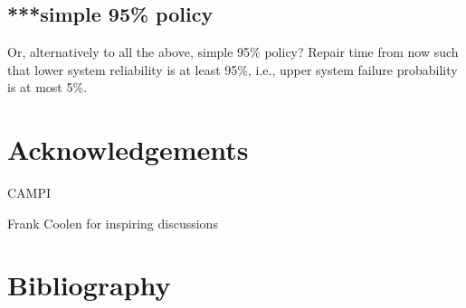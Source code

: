 \documentclass[authoryear]{elsarticle}
\begin{document}
\subsection{***simple 95\% policy}

Or, alternatively to all the above, simple 95\% policy?
Repair time from now such that lower system reliability is at least 95\%, i.e., upper system failure probability is at most 5\%.

\section*{Acknowledgements}

CAMPI

Frank Coolen for inspiring discussions

\section*{Bibliography}




\end{document}
